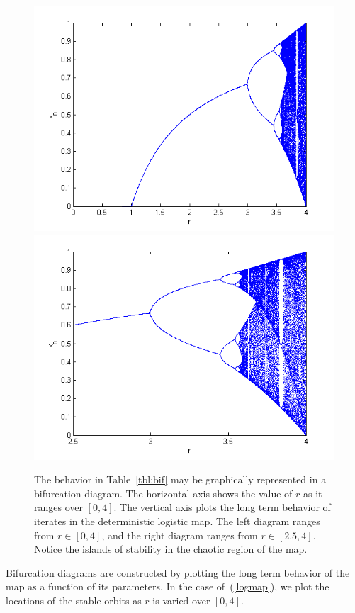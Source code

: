 \begin{figure}[!h]
\caption[Bifurcation diagram for the deterministic logistic map]{The behavior in Table~\ref{tbl:bif} may be graphically represented
in a bifurcation diagram. The horizontal axis shows the value of $r$ as it ranges over
  $[0,4]$. The vertical axis plots the long term behavior of iterates
  in the deterministic logistic map. The left diagram ranges from $r\in
  [0,4]$, and the right diagram ranges from $r\in [2.5,4]$. Notice the
  islands of stability in the chaotic region of the map.}\label{fig:bif}
\centering
\includegraphics[width=.5\textwidth]{figs/det_bif_1.png}\hfill
\includegraphics[width=.5\textwidth]{figs/det_bif_2.png}
\end{figure}
Bifurcation diagrams are constructed by
plotting the long term behavior of the map as a function of its
parameters. In the case of~(\ref{logmap}), we plot the
locations of the stable orbits as $r$ is varied over $[0,4]$.

